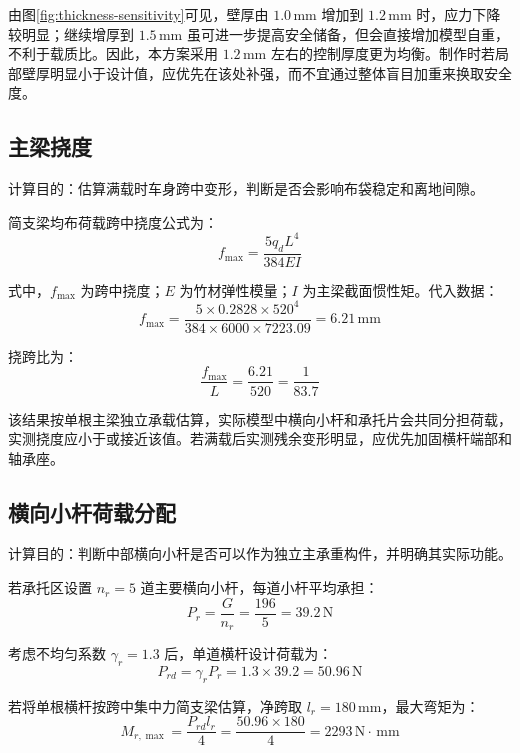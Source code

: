 \documentclass[UTF8,a4paper,12pt,fontset=none]{ctexart}
\numberwithin{equation}{section}
\numberwithin{figure}{section}
\numberwithin{table}{section}
\newcommand{\mm}{\,\mathrm{mm}}
\newcommand{\Nunit}{\,\mathrm{N}}
\begin{document}
由图\ref{fig:thickness-sensitivity}可见，壁厚由 $1.0\mm$ 增加到 $1.2\mm$ 时，应力下降较明显；继续增厚到 $1.5\mm$ 虽可进一步提高安全储备，但会直接增加模型自重，不利于载质比。因此，本方案采用 $1.2\mm$ 左右的控制厚度更为均衡。制作时若局部壁厚明显小于设计值，应优先在该处补强，而不宜通过整体盲目加重来换取安全度。

\subsection{主梁挠度}
计算目的：估算满载时车身跨中变形，判断是否会影响布袋稳定和离地间隙。

简支梁均布荷载跨中挠度公式为：
\begin{equation}
  f_{\max}=\frac{5q_dL^4}{384EI}
\end{equation}

式中，$f_{\max}$ 为跨中挠度；$E$ 为竹材弹性模量；$I$ 为主梁截面惯性矩。代入数据：
\begin{equation}
  f_{\max}=\frac{5\times0.2828\times520^4}{384\times6000\times7223.09}=6.21\mm
\end{equation}

挠跨比为：
\begin{equation}
  \frac{f_{\max}}{L}=\frac{6.21}{520}=\frac{1}{83.7}
\end{equation}

该结果按单根主梁独立承载估算，实际模型中横向小杆和承托片会共同分担荷载，实测挠度应小于或接近该值。若满载后实测残余变形明显，应优先加固横杆端部和轴承座。

\subsection{横向小杆荷载分配}
计算目的：判断中部横向小杆是否可以作为独立主承重构件，并明确其实际功能。

若承托区设置 $n_r=5$ 道主要横向小杆，每道小杆平均承担：
\begin{equation}
  P_r=\frac{G}{n_r}=\frac{196}{5}=39.2\Nunit
\end{equation}

考虑不均匀系数 $\gamma_r=1.3$ 后，单道横杆设计荷载为：
\begin{equation}
  P_{rd}=\gamma_rP_r=1.3\times39.2=50.96\Nunit
\end{equation}

若将单根横杆按跨中集中力简支梁估算，净跨取 $l_r=180\mm$，最大弯矩为：
\begin{equation}
  M_{r,\max}=\frac{P_{rd}l_r}{4}=\frac{50.96\times180}{4}=2293\Nunit\cdot\mm
\end{equation}
\end{document}

